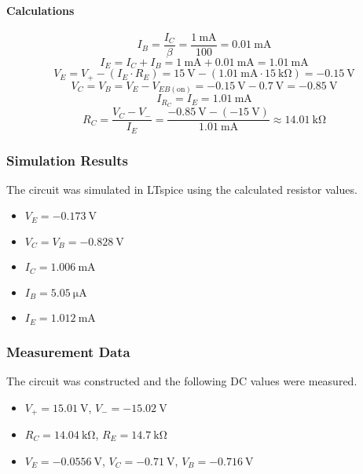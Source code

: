 \documentclass[12pt]{article}
\begin{document}
\paragraph{Calculations}
$$
I_B = \frac{I_C}{\beta} = \frac{\SI{1}{\milli\ampere}}{100} = \SI{0.01}{\milli\ampere}
$$
$$
I_E = I_C + I_B = \SI{1}{\milli\ampere} + \SI{0.01}{\milli\ampere} = \SI{1.01}{\milli\ampere}
$$
$$
V_E = V_{+} - (I_E \cdot R_E) = \SI{15}{\volt} - (\SI{1.01}{\milli\ampere} \cdot \SI{15}{\kilo\ohm}) = \SI{-0.15}{\volt}
$$
$$
V_C = V_B = V_E - V_{EB(\text{on})} = \SI{-0.15}{\volt} - \SI{0.7}{\volt} = \SI{-0.85}{\volt}
$$
$$
I_{R_C} = I_E = \SI{1.01}{\milli\ampere}
$$
$$
R_C = \frac{V_C - V_{-}}{I_E} = \frac{\SI{-0.85}{\volt} - (\SI{-15}{\volt})}{\SI{1.01}{\milli\ampere}} \approx \SI{14.01}{\kilo\ohm}
$$

\subsubsection{Simulation Results}
The circuit was simulated in LTspice using the calculated resistor values.
\begin{itemize}
    \item $V_E = \SI{-0.173}{\volt}$
    \item $V_C = V_B = \SI{-0.828}{\volt}$
    \item $I_C = \SI{1.006}{\milli\ampere}$
    \item $I_B = \SI{5.05}{\micro\ampere}$
    \item $I_E = \SI{1.012}{\milli\ampere}$
\end{itemize}

\subsubsection{Measurement Data}
The circuit was constructed and the following DC values were measured.
\begin{itemize}
    \item $V_+ = \SI{15.01}{\volt}$, $V_- = \SI{-15.02}{\volt}$
    \item $R_C = \SI{14.04}{\kilo\ohm}$, $R_E = \SI{14.7}{\kilo\ohm}$
    \item $V_E = \SI{-0.0556}{\volt}$, $V_C = \SI{-0.71}{\volt}$, $V_B = \SI{-0.716}{\volt}$
\end{itemize}
\end{document}
